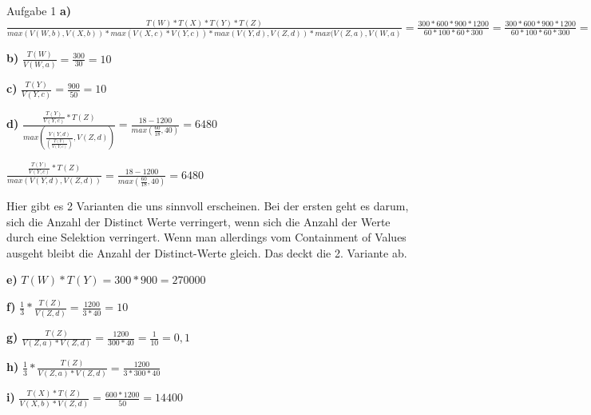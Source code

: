 \documentclass[12pt]{article}
\begin{document}
\begin{section}{Aufgabe 1}
\textbf{a)} 
$\frac{T(W) * T(X) * T(Y) * T(Z)}{max( V(W,b), V(X,b) ) * max( V(X,c) * V(Y,c)) * max( V(Y,d), V(Z,d)) * max(V(Z,a),V(W,a)} = 
\frac{300 * 600 * 900 * 1200}{60 * 100 * 60 * 300} = \frac{300 * 600 * 900 * 1200}{60 * 100 * 60 * 300} =  \frac{300 * 900 * 1200}{600*300} = 1800$

\noindent \textbf{b)}
$\frac{T(W)}{V(W,a)}  = \frac{300}{30} = 10$

\noindent \textbf{c)}
$\frac{T(Y)}{V(Y,c)}  = \frac{900}{50} = 10$


\noindent \textbf{d)}
$\frac{\frac{T(Y)}{V(Y,c)} * T(Z)}{max( \frac{V(Y,d)}{(\frac{T(Y)}{V(Y,c)})},V(Z,d))}  = \frac{18-1200}{max(\frac{60}{18},40)} = 6480 $

$\frac{\frac{T(Y)}{V(Y,c)} * T(Z)}{max( V(Y,d), V(Z,d)) }  = \frac{18-1200}{max(\frac{60}{18},40)} = 6480 $

Hier gibt es 2 Varianten die uns sinnvoll erscheinen. Bei der ersten geht es darum, sich die Anzahl der Distinct Werte verringert, wenn sich die Anzahl der Werte durch eine Selektion verringert. Wenn man allerdings vom Containment of Values ausgeht bleibt die Anzahl der Distinct-Werte gleich. Das deckt die 2. Variante ab.

\noindent \textbf{e)}
$T(W)*T(Y) = 300 * 900 = 270000$

\noindent \textbf{f)}
$\frac{1}{3} * \frac{T(Z)}{V(Z,d)} = \frac{1200}{3*40}=10$

\noindent \textbf{g)}
$\frac{T(Z)}{V(Z,a)*V(Z,d)} = \frac{1200}{300*40} = \frac{1}{10} =0,1$

\noindent \textbf{h)}
$\frac{1}{3} * \frac{T(Z)}{V(Z,a)*V(Z,d)} = \frac{1200}{3*300*40}$

\noindent \textbf{i)}
$\frac{T(X)*T(Z)}{V(X,b)*V(Z,d)} = \frac{600*1200}{50} = 14400$

\end{section}
\end{document}
